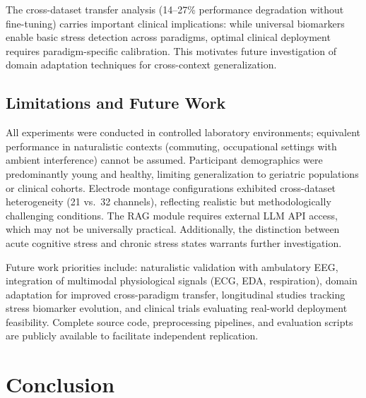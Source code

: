 \documentclass[journal,twoside]{IEEEtran}
\begin{document}
The cross-dataset transfer analysis (14--27\% performance degradation without fine-tuning) carries important clinical implications: while universal biomarkers enable basic stress detection across paradigms, optimal clinical deployment requires paradigm-specific calibration. This motivates future investigation of domain adaptation techniques for cross-context generalization.

\subsection{Limitations and Future Work}

All experiments were conducted in controlled laboratory environments; equivalent performance in naturalistic contexts (commuting, occupational settings with ambient interference) cannot be assumed. Participant demographics were predominantly young and healthy, limiting generalization to geriatric populations or clinical cohorts. Electrode montage configurations exhibited cross-dataset heterogeneity (21 vs.\ 32 channels), reflecting realistic but methodologically challenging conditions. The RAG module requires external LLM API access, which may not be universally practical. Additionally, the distinction between acute cognitive stress and chronic stress states warrants further investigation.

Future work priorities include: naturalistic validation with ambulatory EEG, integration of multimodal physiological signals (ECG, EDA, respiration), domain adaptation for improved cross-paradigm transfer, longitudinal studies tracking stress biomarker evolution, and clinical trials evaluating real-world deployment feasibility. Complete source code, preprocessing pipelines, and evaluation scripts are publicly available to facilitate independent replication.

\section{Conclusion}
\end{document}
